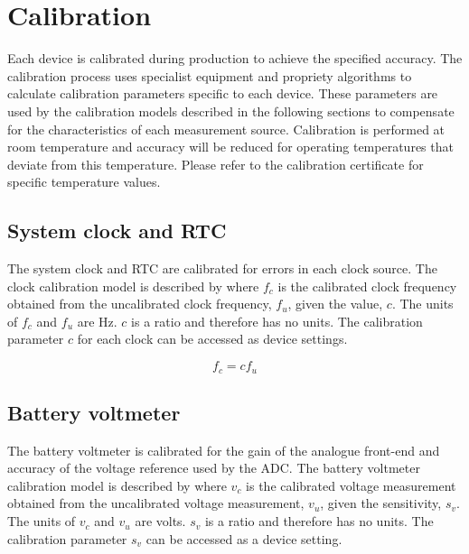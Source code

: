 \section{Calibration}
\label{sec:calibration}

Each device is calibrated during production to achieve the specified accuracy.  The calibration process uses specialist equipment and propriety algorithms to calculate calibration parameters specific to each device.  These parameters are used by the calibration models described in the following sections to compensate for the characteristics of each measurement source.  Calibration is performed at room temperature and accuracy will be reduced for operating temperatures that deviate from this temperature.  Please refer to the calibration certificate for specific temperature values.

\subsection{System clock and \acs{RTC}}
\label{sec:systemClockAndRtc}

The system clock and \ac{RTC} are calibrated for errors in each clock source.  The clock calibration model is described by  where $f_c$ is the calibrated clock frequency obtained from the uncalibrated clock frequency, $f_u$, given the value, $c$.  The units of $f_c$ and $f_u$ are Hz.  $c$ is a ratio and therefore has no units.  The calibration parameter $c$ for each clock can be accessed as device settings.

\begin{equation}
\label{eq:clock}
f_c = c f_u
\end{equation}

\subsection{Battery voltmeter}
\label{sec:batteryVoltmeter}

The battery voltmeter is calibrated for the gain of the analogue front-end and accuracy of the voltage reference used by the \ac{ADC}.  The battery voltmeter calibration model is described by  where $v_c$ is the calibrated voltage measurement obtained from the uncalibrated voltage measurement, $v_u$, given the sensitivity, $s_v$.  The units of $v_c$ and $v_u$ are volts.  $s_v$ is a ratio and therefore has no units.  The calibration parameter $s_v$ can be accessed as a device setting.

